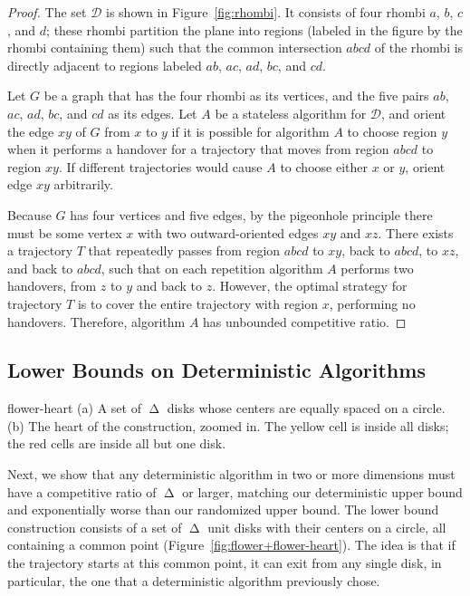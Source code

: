 \documentclass[runningheads]{llncs}
\newcommand {\script} [1] {\ensuremath {\mathcal {#1}}}
\DeclareMathOperator {\ply}{\Delta}
\begin{document}
\begin{proof}
The set $\script D$ is shown in Figure~\ref{fig:rhombi}. It consists of four rhombi $a$, $b$, $c$, and $d$; these rhombi partition the plane into regions (labeled in the figure by the rhombi containing them) such that the common intersection $abcd$ of the rhombi is directly adjacent to regions labeled $ab$, $ac$, $ad$, $bc$, and $cd$.

Let $G$ be a graph that has the four rhombi as its vertices, and the five pairs $ab$, $ac$, $ad$, $bc$, and $cd$ as its edges. Let $A$ be a stateless algorithm for $\script D$, and orient the edge $xy$ of $G$ from $x$ to $y$ if it is possible for algorithm $A$ to choose region $y$ when it performs a handover for a trajectory that moves from region $abcd$ to region $xy$. If different trajectories would cause $A$ to choose either $x$ or $y$, orient edge $xy$ arbitrarily.

Because $G$ has four vertices and five edges, by the pigeonhole principle there must be some vertex $x$ with two outward-oriented edges $xy$ and $xz$. There exists a trajectory $T$ that repeatedly passes from region $abcd$ to $xy$, back to $abcd$, to $xz$, and back to $abcd$, such that on each repetition algorithm $A$ performs two handovers, from $z$ to $y$ and back to $z$. However, the optimal strategy for trajectory $T$ is to cover the entire trajectory with region $x$, performing no handovers. Therefore, algorithm $A$ has unbounded competitive ratio.
\end{proof}

\subsection{Lower Bounds on Deterministic Algorithms}
 {flower-heart} {(a) A set of $\ply$ disks whose centers are equally spaced on a circle. (b) The heart of the construction, zoomed in. The yellow cell is inside all disks; the red cells are inside all but one disk.}

Next, we show that any deterministic algorithm in two or more dimensions must have a competitive ratio of $\ply$ or larger, matching our deterministic upper bound and exponentially worse than our randomized upper bound.  The lower bound construction consists of a set of $\ply$ unit disks with their centers on a circle, all containing a common point (Figure~\ref {fig:flower+flower-heart}). The idea is that if the trajectory starts at this common point, it can exit from any single disk, in particular, the one that a deterministic algorithm previously chose.
\end{document}
